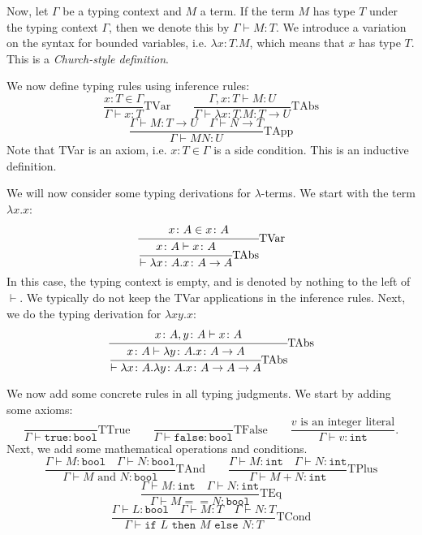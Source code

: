 \documentclass[a4paper, openany]{memoir}
\theoremstyle{definition}
\begin{document}
    Now, let $\Gamma$ be a typing context and $M$ a term. If the term $M$ has type $T$ under the typing context $\Gamma$, then we denote this by $\Gamma \vdash M \colon T$. We introduce a variation on the syntax for bounded variables, i.e. $\lambda x \colon T.M$, which means that $x$ has type $T$. This is a \emph{Church-style definition}.

    We now define typing rules using inference rules:
    \[\frac{x \colon T \in \Gamma}{\Gamma \vdash x \colon T}\textrm{TVar} \qquad \frac{\Gamma, x \colon T \vdash M \colon U}{\Gamma \vdash \lambda x \colon T.M \colon T \to U} \textrm{TAbs}\]
    \[\frac{\Gamma \vdash M \colon T \to U \quad \Gamma \vdash N \to T}{\Gamma \vdash MN \colon U} \textrm{TApp}\]
    Note that TVar is an axiom, i.e. $x \colon T \in \Gamma$ is a side condition. This is an inductive definition.

    We will now consider some typing derivations for $\lambda$-terms. We start with the term $\lambda x.x$:
    \[\cfrac{x \colon A \in x \colon A}{\cfrac{x \colon A \vdash x \colon A}{\vdash \lambda x \colon A. x \colon A \to A} \textrm{TAbs}} \textrm{TVar}\]
    In this case, the typing context is empty, and is denoted by nothing to the left of $\vdash$. We typically do not keep the TVar applications in the inference rules. Next, we do the typing derivation for $\lambda xy.x$:
    \[\cfrac{x \colon A, y \colon A \vdash x \colon A}{\cfrac{x \colon A \vdash \lambda y \colon A.x \colon A \to A}{\vdash \lambda x \colon A.\lambda y \colon A.x \colon A \to A \to A}\textrm{TAbs}}\textrm{TAbs}\]

    We now add some concrete rules in all typing judgments. We start by adding some axioms:
    \[\frac{}{\Gamma \vdash \texttt{true} \colon \texttt{bool}} \textrm{TTrue} \qquad \frac{}{\Gamma \vdash \texttt{false} \colon \texttt{bool}} \textrm{TFalse} \qquad \frac{v \textrm{ is an integer literal}}{\Gamma \vdash v \colon \texttt{int}}.\]
    Next, we add some mathematical operations and conditions.
    \[\frac{\Gamma \vdash M \colon \texttt{bool} \quad \Gamma \vdash N \colon \texttt{bool}}{\Gamma \vdash M \textrm{ and } N \colon \texttt{bool}} \textrm{TAnd} \qquad \frac{\Gamma \vdash M \colon \texttt{int} \quad \Gamma \vdash N \colon \texttt{int}}{\Gamma \vdash M + N \colon \texttt{int}} \textrm{TPlus}\]
    \[\frac{\Gamma \vdash M \colon \texttt{int} \quad \Gamma \vdash N \colon \texttt{int}}{\Gamma \vdash M == N \colon \texttt{bool}} \textrm{TEq}\]
    \[\frac{\Gamma \vdash L \colon \texttt{bool} \quad \Gamma \vdash M \colon T \quad \Gamma \vdash N \colon T}{\Gamma \vdash \texttt{if } L \texttt{ then } M \texttt{ else } N \colon T} \textrm{TCond}\]
\end{document}
